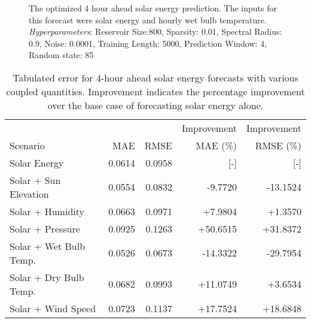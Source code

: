 \begin{figure*}[h]
  \centering
  
  \caption{The optimized 4 hour ahead solar energy prediction. The inputs for this forecast were solar energy and hourly wet bulb temperature. \textit{Hyperparameters}: Reservoir Size:800, Sparsity: 0.01, Spectral Radius: 0.9, Noise: 0.0001, Training Length: 5000, Prediction Window: 4, Random state: 85}
  \label{fig:solar04}
\end{figure*}
  \begin{table*}[h]
    \centering
    \caption{Tabulated error for 4-hour ahead solar energy forecasts with various coupled quantities. Improvement indicates the percentage improvement over the base case of forecasting solar energy alone.}
    \label{tab:solar04}
    \begin{tabular}{l|r|r|r|r}
      &  & & Improvement & Improvement \\
      Scenario  & MAE & RMSE & MAE (\%) & RMSE (\%)\\
      \hline
      Solar Energy & 0.0614 & 0.0958 & [-] & [-] \\
      Solar + Sun Elevation & 0.0554 &  0.0832 & -9.7720 & -13.1524 \\
      Solar + Humidity & 0.0663 & 0.0971 & +7.9804 & +1.3570 \\
      Solar + Pressure & 0.0925 & 0.1263 & +50.6515 & +31.8372 \\
      Solar + Wet Bulb Temp. & 0.0526 & 0.0673 & -14.3322 & -29.7954 \\
      Solar + Dry Bulb Temp. & 0.0682 & 0.0993 & +11.0749 & +3.6534 \\
      Solar + Wind Speed & 0.0723 & 0.1137 & +17.7524 & +18.6848 \\
    \end{tabular}
  \end{table*}
